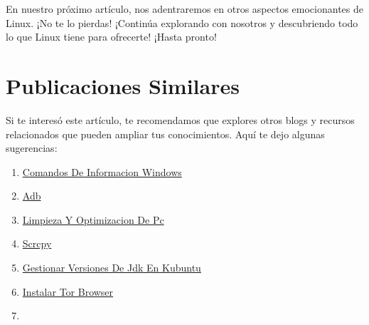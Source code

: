\documentclass[
  jou,
  floatsintext,
  longtable,
  a4paper,
  nolmodern,
  notxfonts,
  notimes,
  12pt,
  colorlinks=true,linkcolor=blue,citecolor=blue,urlcolor=blue]{apa7}
\providecommand{\tightlist}{%
  \setlength{\itemsep}{0pt}\setlength{\parskip}{0pt}}
\begin{document}
En nuestro próximo artículo, nos adentraremos en otros aspectos
emocionantes de Linux. ¡No te lo pierdas! ¡Continúa explorando con
nosotros y descubriendo todo lo que Linux tiene para ofrecerte! ¡Hasta
pronto!

\section{Publicaciones Similares}\label{publicaciones-similares}

Si te interesó este artículo, te recomendamos que explores otros blogs y
recursos relacionados que pueden ampliar tus conocimientos. Aquí te dejo
algunas sugerencias:

\begin{enumerate}
\def\labelenumi{\arabic{enumi}.}
\tightlist
\item
  \href{https://chaska-x.netlify.app/operating-system/2017-05-21-comandos-de-informacion-windows/index.pdf}{}
  \href{https://chaska-x.netlify.app/operating-system/2017-05-21-comandos-de-informacion-windows}{Comandos
  De Informacion Windows}
\item
  \href{https://chaska-x.netlify.app/operating-system/2019-06-19-adb/index.pdf}{}
  \href{https://chaska-x.netlify.app/operating-system/2019-06-19-adb}{Adb}
\item
  \href{https://chaska-x.netlify.app/operating-system/2021-08-17-limpieza-y-optimizacion-de-pc/index.pdf}{}
  \href{https://chaska-x.netlify.app/operating-system/2021-08-17-limpieza-y-optimizacion-de-pc}{Limpieza
  Y Optimizacion De Pc}
\item
  \href{https://chaska-x.netlify.app/operating-system/2021-10-21-scrcpy/index.pdf}{}
  \href{https://chaska-x.netlify.app/operating-system/2021-10-21-scrcpy}{Scrcpy}
\item
  \href{https://chaska-x.netlify.app/operating-system/2022-05-12-gestionar-versiones-de-jdk-en-kubuntu/index.pdf}{}
  \href{https://chaska-x.netlify.app/operating-system/2022-05-12-gestionar-versiones-de-jdk-en-kubuntu}{Gestionar
  Versiones De Jdk En Kubuntu}
\item
  \href{https://chaska-x.netlify.app/operating-system/2022-07-21-instalar-tor-browser/index.pdf}{}
  \href{https://chaska-x.netlify.app/operating-system/2022-07-21-instalar-tor-browser}{Instalar
  Tor Browser}
\item
  \href{https://chaska-x.netlify.app/operating-system/2022-08-14-crear-enlaces-duros-o-hard-link-en-linux/index.pdf}{}

\end{enumerate}
\end{document}
